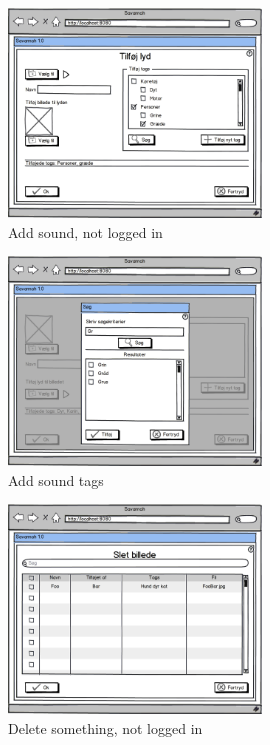 \begin{figure}[H]
	\centering
		\includegraphics[width=0.60\textwidth]{images/Mocks/012-AddSound.png}
	\caption{Add sound, not logged in}
	\label{fig:012-AddSound}
\end{figure}

\begin{figure}[H]
	\centering
		\includegraphics[width=0.60\textwidth]{images/Mocks/0121AddSoundTags.png}
	\caption{Add sound tags}
	\label{fig:0121AddSoundTags}
\end{figure}


\begin{figure}
	\centering
		\includegraphics[width=0.60\textwidth]{images/Mocks/013-Delete.png}
	\caption{Delete something, not logged in}
	\label{fig:013-Delete}
\end{figure}


